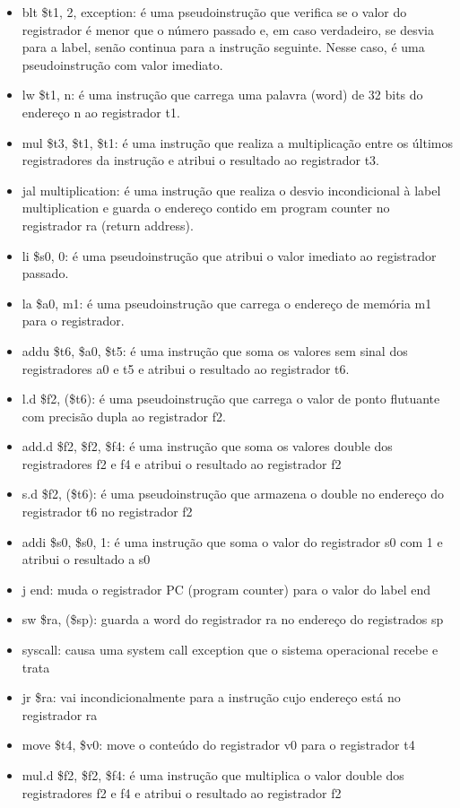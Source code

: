 \documentclass[
	12pt,				%
	oneside,			%
	a4paper,			%
	english,			%
	brazil				%
	]{abntex2ppgsi}
\begin{document}
\begin{itemize}
    \item blt \$t1, 2, exception: é uma pseudoinstrução que verifica se o valor do registrador é menor que o número passado e, em caso verdadeiro, se desvia para a label, senão continua para a instrução seguinte. Nesse caso, é uma pseudoinstrução com valor imediato.
    \item lw \$t1, n: é uma instrução que carrega uma palavra (word) de 32 bits do endereço n ao registrador t1.
    \item mul \$t3, \$t1, \$t1: é uma instrução que realiza a multiplicação entre os últimos registradores da instrução e atribui o resultado ao registrador t3.
    \item jal multiplication: é uma instrução que realiza o desvio incondicional à label multiplication e guarda o endereço contido em program counter no registrador ra (return address).
    \item li \$s0, 0: é uma pseudoinstrução que atribui o valor imediato ao registrador passado.
    \item la \$a0, m1: é uma pseudoinstrução que carrega o endereço de memória m1 para o registrador.
    \item addu \$t6, \$a0, \$t5: é uma instrução que soma os valores sem sinal dos registradores a0 e t5 e atribui o resultado ao registrador t6.
    \item l.d \$f2, (\$t6): é uma pseudoinstrução que carrega o valor de ponto flutuante com precisão dupla ao registrador f2.
    \item add.d \$f2, \$f2, \$f4: é uma instrução que soma os valores double dos registradores f2 e f4 e atribui o resultado ao registrador f2
    \item s.d \$f2, (\$t6): é uma pseudoinstrução que armazena o double no endereço do registrador t6 no registrador f2
    \item addi \$s0, \$s0, 1: é uma instrução que soma o valor do registrador s0 com 1 e atribui o resultado a s0
    \item j end: muda o registrador PC (program counter) para o valor do label end
    \item sw \$ra, (\$sp): guarda a word do registrador ra no endereço do registrados sp 
    \item syscall: causa uma system call exception que o sistema operacional recebe e trata
    \item jr \$ra: vai incondicionalmente para a instrução cujo endereço está no registrador ra
    \item move \$t4, \$v0: move o conteúdo do registrador v0 para o registrador t4 
    \item mul.d \$f2, \$f2, \$f4: é uma instrução que multiplica o valor double dos registradores f2 e f4 e atribui o resultado ao registrador f2
\end{itemize}
\end{document}
